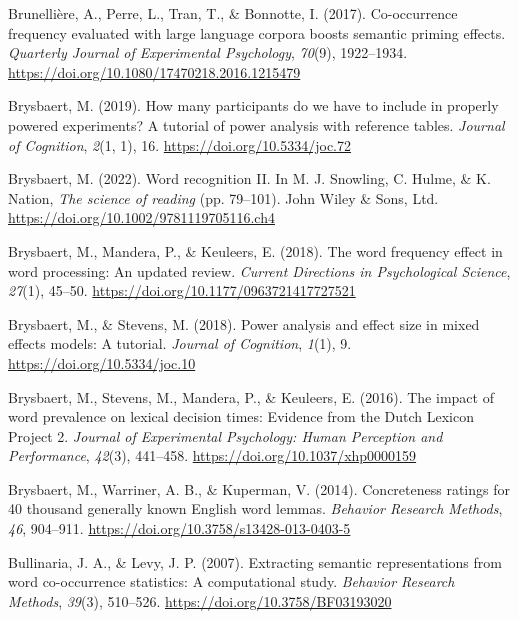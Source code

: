 \documentclass[
  12pt,
  man,floatsintext]{apa7}
\newlength{\cslhangindent}
\newlength{\cslentryspacingunit} %
\newenvironment{CSLReferences}[2] %
 {%
  \setlength{\parindent}{0pt}
  \ifodd #1
  \let\oldpar\par
  \def\par{\hangindent=\cslhangindent\oldpar}
  \fi
  \setlength{\parskip}{#2\cslentryspacingunit}
 }%
 {}
\begin{document}
\begin{CSLReferences}{1}{0}
\leavevmode{}%
Brunellière, A., Perre, L., Tran, T., \& Bonnotte, I. (2017). Co-occurrence frequency evaluated with large language corpora boosts semantic priming effects. \emph{Quarterly Journal of Experimental Psychology}, \emph{70}(9), 1922--1934. \url{https://doi.org/10.1080/17470218.2016.1215479}

\leavevmode{}%
Brysbaert, M. (2019). How many participants do we have to include in properly powered experiments? {A} tutorial of power analysis with reference tables. \emph{Journal of Cognition}, \emph{2}(1, 1), 16. \url{https://doi.org/10.5334/joc.72}

\leavevmode{}%
Brysbaert, M. (2022). Word recognition {II}. In M. J. Snowling, C. Hulme, \& K. Nation, \emph{The science of reading} (pp. 79--101). {John Wiley \& Sons, Ltd}. \url{https://doi.org/10.1002/9781119705116.ch4}

\leavevmode{}%
Brysbaert, M., Mandera, P., \& Keuleers, E. (2018). The word frequency effect in word processing: {An} updated review. \emph{Current Directions in Psychological Science}, \emph{27}(1), 45--50. \url{https://doi.org/10.1177/0963721417727521}

\leavevmode{}%
Brysbaert, M., \& Stevens, M. (2018). Power analysis and effect size in mixed effects models: A tutorial. \emph{Journal of Cognition}, \emph{1}(1), 9. \url{https://doi.org/10.5334/joc.10}

\leavevmode{}%
Brysbaert, M., Stevens, M., Mandera, P., \& Keuleers, E. (2016). The impact of word prevalence on lexical decision times: {Evidence} from the {Dutch Lexicon Project} 2. \emph{Journal of Experimental Psychology: Human Perception and Performance}, \emph{42}(3), 441--458. \url{https://doi.org/10.1037/xhp0000159}

\leavevmode{}%
Brysbaert, M., Warriner, A. B., \& Kuperman, V. (2014). Concreteness ratings for 40 thousand generally known {English} word lemmas. \emph{Behavior Research Methods}, \emph{46}, 904--911. \url{https://doi.org/10.3758/s13428-013-0403-5}

\leavevmode{}%
Bullinaria, J. A., \& Levy, J. P. (2007). Extracting semantic representations from word co-occurrence statistics: {A} computational study. \emph{Behavior Research Methods}, \emph{39}(3), 510--526. \url{https://doi.org/10.3758/BF03193020}


\end{CSLReferences}
\end{document}
